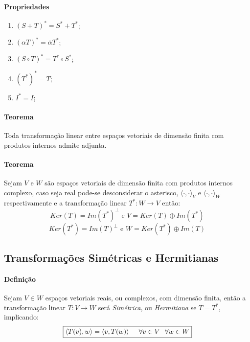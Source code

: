 \documentclass{article}
\begin{document}
        \paragraph{Propriedades}
            \begin{enumerate}[noitemsep]
                \item $(S + T)^{*} = S^{*} + T^{*}$;
                \item $(\alpha T)^{*} = \overline{\alpha} T^{*}$;
                \item $(S \circ T)^{*} = T^{*} \circ S^{*}$;
                \item $(T^{*})^{*} = T$;
                \item $I^{*} = I$;
            \end{enumerate}

        \paragraph{Teorema}Toda transformação linear entre espaços vetoriais de dimensão finita com produtos internos admite adjunta.

        \paragraph{Teorema}Sejam $V$ e $W$ são espaços vetoriais de dimensão finita com produtos internos complexo, caso seja real pode-se desconsiderar o asterisco, $\langle\cdot,\cdot\rangle_{V}$ e $\langle\cdot,\cdot\rangle_{W}$ respectivamente e a transformação linear $T^{*}: W \rightarrow V$ então:
            \[\boxed{Ker(T) = Im(T^{*})^{\bot} \text{ e } V = Ker(T) \oplus Im(T^{*})}\]
            \[\boxed{Ker(T^{*}) = Im(T)^{\bot} \text{ e } W = Ker(T^{*}) \oplus Im(T)}\]

        \subsection{Transformações Simétricas e Hermitianas}
            \paragraph{Definição}Sejam $V\in W$ espaços vetoriais reais, ou complexos, com dimensão finita, então a transformação linear $T: V \rightarrow W$ será \textit{Simétrica}, ou \textit{Hermitiana} se $T = T^{*}$, implicando:
                \[\boxed{\langle T(v), w \rangle = \langle v, T(w) \rangle \hspace{5mm} \forall v\in V \hspace{2.5mm} \forall w\in W}\]
\end{document}
